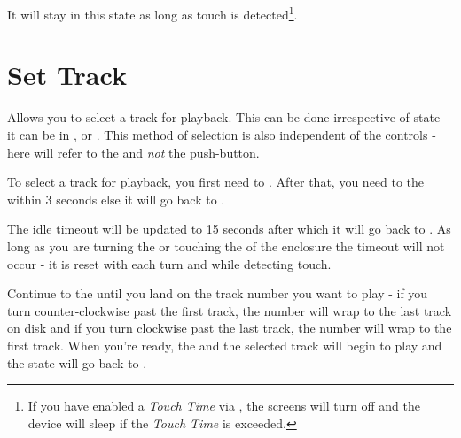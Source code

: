 It will stay in this state as long as touch is detected\footnote{ If you have
enabled a \textit{Touch Time} via \hyperref[Power Settings]{}, the screens
will turn off and the device will sleep if the \textit{Touch Time} is exceeded.}.

\section{Set Track} \label{Set Track} 

Allows you to select a track for playback. This can be done
irrespective of  state - it can be in ,  or
.  This method of selection is also independent of the 
controls -  here will refer to the  and \textit{not} the
 push-button.

\par\medskip

To select a track for playback, you first need to . After that, you
need to  the  within \num{3} seconds else it will go back to
.


The idle timeout will be updated to \num{15} seconds after which it will go back
to . As long as you are turning the  or touching the  of
the enclosure the timeout will not occur - it is reset with each turn and while
detecting touch.


Continue to  the  until you land on the track number you want
to play - if you turn counter-clockwise past the first track, the number will
wrap to the last track on disk and if you turn clockwise past the last track,
the number will wrap to the first track.  When you're ready,  the
 and the selected track will begin to play and the state will go back to
.



